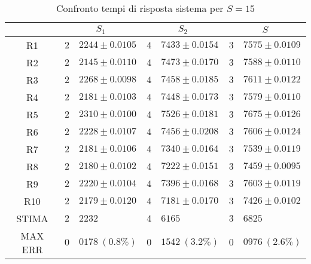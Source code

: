 \begin{table}[!h]
\begin{tabular}{c|r@{.}l|r@{.}l|r@{.}l}
& \multicolumn{2}{|c|}{$S_1$}
& \multicolumn{2}{|c|}{$S_2$}
& \multicolumn{2}{|c}{$S$} 
\\          
\hline
R1      & $2$&$2244 \pm 0.0105$ & $4$&$7433 \pm 0.0154$ & $3$&$7575 \pm 0.0109$ \\
R2      & $2$&$2145 \pm 0.0110$ & $4$&$7473 \pm 0.0170$ & $3$&$7588 \pm 0.0110$ \\
R3      & $2$&$2268 \pm 0.0098$ & $4$&$7458 \pm 0.0185$ & $3$&$7611 \pm 0.0122$ \\
R4      & $2$&$2181 \pm 0.0103$ & $4$&$7448 \pm 0.0173$ & $3$&$7579 \pm 0.0110$ \\
R5      & $2$&$2310 \pm 0.0100$ & $4$&$7526 \pm 0.0181$ & $3$&$7675 \pm 0.0126$ \\
R6      & $2$&$2228 \pm 0.0107$ & $4$&$7456 \pm 0.0208$ & $3$&$7606 \pm 0.0124$ \\
R7      & $2$&$2181 \pm 0.0106$ & $4$&$7340 \pm 0.0164$ & $3$&$7539 \pm 0.0119$ \\
R8      & $2$&$2180 \pm 0.0102$ & $4$&$7222 \pm 0.0151$ & $3$&$7459 \pm 0.0095$ \\
R9      & $2$&$2220 \pm 0.0104$ & $4$&$7396 \pm 0.0168$ & $3$&$7603 \pm 0.0119$ \\
R10     & $2$&$2179 \pm 0.0120$ & $4$&$7181 \pm 0.0170$ & $3$&$7426 \pm 0.0102$ \\
STIMA   & $2$&$2232$            & $4$&$6165$            & $3$&$6825$            \\
MAX ERR & $0$&$0178 \ (0.8\%)$  & $0$&$1542 \ (3.2\%)$  & $0$&$0976 \ (2.6\%)$    
\end{tabular}
\centering
\caption{Confronto tempi di risposta sistema per $S=15$}
\label{tab:15_s}
\end{table}
